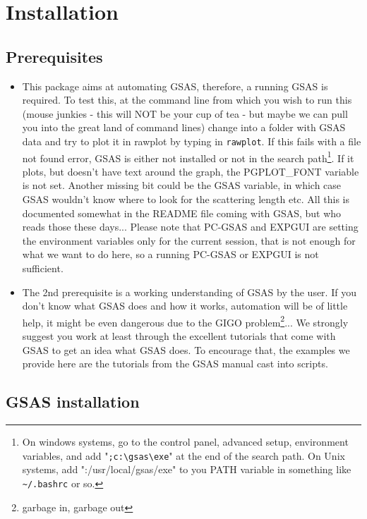 \chapter{Installation}

\section{Prerequisites}

\begin{itemize}
\item This package aims at automating GSAS, therefore, a running GSAS is required. To test this, at the command line from which you wish to run this (mouse junkies - this will NOT be your cup of tea - but maybe we can pull you into the great land of command lines) change into a folder with GSAS data and try to plot it in rawplot by typing in \texttt{rawplot}. If this fails with a file not found error, GSAS is either not installed or not in the search path\footnote{On windows systems, go to the control panel, advanced setup, environment variables, and add "\texttt{;c:\textbackslash gsas\textbackslash exe}" at the end of the search path. On Unix systems, add ":/usr/local/gsas/exe" to you PATH variable in something like \texttt{\textasciitilde/.bashrc} or so.}. If it plots, but doesn't have text around the graph, the PGPLOT\_FONT variable is not set. Another missing bit could be the GSAS variable, in which case GSAS wouldn't know where to look for the scattering length etc. All this is documented somewhat in the README file coming with GSAS, but who reads those these days... Please note that PC-GSAS and EXPGUI are setting the environment variables only for the current session, that is not enough for what we want to do here, so a running PC-GSAS or EXPGUI is not sufficient.
\item The 2nd prerequisite is a working understanding of GSAS by the user. If you don't know what GSAS does and how it works, automation will be of little help, it might be even dangerous due to the GIGO problem\footnote{garbage in, garbage out}... We strongly suggest you work at least through the excellent tutorials that come with GSAS to get an idea what GSAS does. To encourage that, the examples we provide here are the tutorials from the GSAS manual cast into scripts.
\end{itemize}

\section{GSAS installation}

